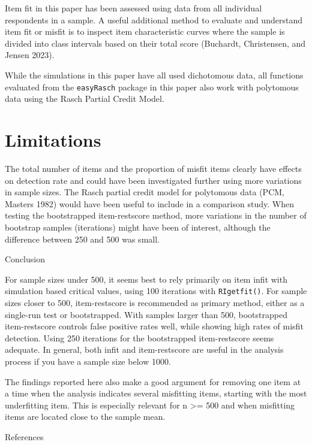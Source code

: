 \documentclass[
  letterpaper,
  DIV=11,
  numbers=noendperiod]{scrartcl}
\begin{document}
Item fit in this paper has been assessed using data from all individual
respondents in a sample. A useful additional method to evaluate and
understand item fit or misfit is to inspect item characteristic curves
where the sample is divided into class intervals based on their total
score (Buchardt, Christensen, and Jensen 2023).

While the simulations in this paper have all used dichotomous data, all
functions evaluated from the \texttt{easyRasch} package in this paper
also work with polytomous data using the Rasch Partial Credit Model.

\section{Limitations}\label{limitations}

The total number of items and the proportion of misfit items clearly
have effects on detection rate and could have been investigated further
using more variations in sample sizes. The Rasch partial credit model
for polytomous data (PCM, Masters 1982) would have been useful to
include in a comparison study. When testing the bootstrapped
item-restscore method, more variations in the number of bootstrap
samples (iterations) might have been of interest, although the
difference between 250 and 500 was small.

Conclusion

For sample sizes under 500, it seems best to rely primarily on item
infit with simulation based critical values, using 100 iterations with
\texttt{RIgetfit()}. For sample sizes closer to 500, item-restscore is
recommended as primary method, either as a single-run test or
bootstrapped. With samples larger than 500, bootstrapped item-restscore
controls false positive rates well, while showing high rates of misfit
detection. Using 250 iterations for the bootstrapped item-restscore
seems adequate. In general, both infit and item-restscore are useful in
the analysis process if you have a sample size below 1000.

The findings reported here also make a good argument for removing one
item at a time when the analysis indicates several misfitting items,
starting with the most underfitting item. This is especially relevant
for n \textgreater= 500 and when misfitting items are located close to
the sample mean.

References
\end{document}
